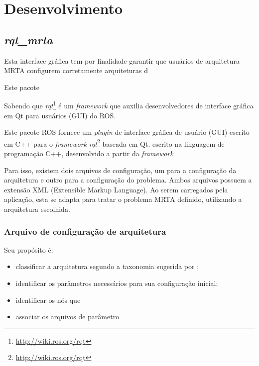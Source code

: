 \chapter[Desenvolvimento]{Desenvolvimento} \label{cap:desenvolvimento}
    
    
    \section{\textit{rqt\_mrta}}
        Esta interface gráfica tem por finalidade garantir que usuários de arquitetura MRTA configurem corretamente arquiteturas d
        
        Este pacote 
        
        Sabendo que \textit{rqt}\footnote{\url{http://wiki.ros.org/rqt}} é um \textit{framework} que auxilia desenvolvedores de interface gráfica em Qt \cite{ref:yafei2012qt} para usuários (GUI) do ROS.
        
        Este pacote ROS fornece um \textit{plugin} de interface gráfica de usuário (GUI) escrito em C++ para o \textit{framework} \textit{rqt}\footnote{\url{http://wiki.ros.org/rqt}} baseada em Qt\cite{ref:yafei2012qt}. escrito na linguagem de programação C++, desenvolvido a partir da \textit{framework} 
        
        Para isso, existem dois arquivos de configuração, um para a configuração da arquitetura e outro para a configuração do problema. Ambos arquivos possuem a extensão XML (Extensible Markup Language). Ao serem carregados pela aplicação, esta se adapta para tratar o problema MRTA definido, utilizando a arquitetura escolhida. 
        
        \subsection{Arquivo de configuração de arquitetura}
        Seu propósito é:
        
        \begin{itemize}
            \item classificar a arquitetura segundo a taxonomia sugerida por ;
            \item identificar os parâmetros necessários para sua configuração inicial;
            \item identificar os nós que
            \item associar os arquivos de parâmetro
        \end{itemize}
        
